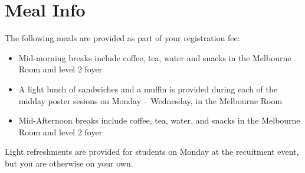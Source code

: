 \setheaders{}{}
\section{Meal Info}{}

The following meals are provided as part of your registration fee:

\begin{itemize}
\item Mid-morning breaks include coffee, tea, water and snacks
	in the Melbourne Room and level 2 foyer
\item A light lunch of sandwiches and a muffin is provided during each
	of the midday poster sesions on Monday -- Wednesday,
	in the Melbourne Room
\item Mid-Afternoon breaks include coffee, tea, water, and 
	snacks in the Melbourne Room and level 2 foyer
\end{itemize}

Light refreshments are provided for students on Monday at the recuitment event,
but you are otherwise on your own.

